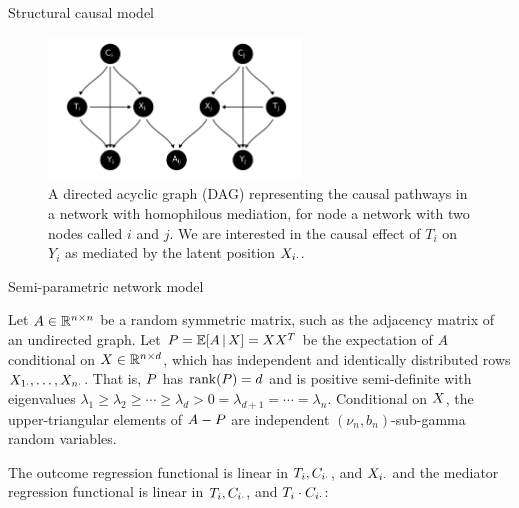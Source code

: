 \documentclass[final]{beamer}
\newlength{\colwidth}
\begin{document}
\begin{frame}[t]
\begin{columns}[t]
\begin{column}{\colwidth}

  \begin{block}{Structural causal model}

    \begin{figure}[ht]
      \centering
      \includegraphics[width=0.6\textwidth]{figures/dags/full_mediating.png}
      \caption{A directed acyclic graph (DAG) representing the causal pathways in a network with homophilous mediation, for node a network with two nodes called $i$ and $j$. We are interested in the causal effect of $T_i$ on $Y_i$ as mediated by the latent position $X_{i \cdot}$.}
      \label{fig:mediating}
    \end{figure}

  \end{block}

  \begin{block}{Semi-parametric network model}

    Let $A \in \mathbb{R}^{n \times n}$ be a random symmetric matrix, such as the adjacency matrix of an undirected graph. Let $\Apop = \E[\X]{A} = \X \X^T$ be the expectation of $A$ conditional on $X \in \mathbb{R}^{n \times d}$, which has independent and identically distributed rows $X_{1 \cdot}, \dots, X_{n \cdot}$. That is, $P$ has $\rank \paren*{\Apop} = d$ and is positive semi-definite with eigenvalues $\lambda_1 \ge \lambda_2 \ge \cdots \ge \lambda_d > 0 = \lambda_{d+1} = \cdots = \lambda_n$. Conditional on $X$, the upper-triangular elements of $A - P$ are independent $(\nu_n, b_n)$-sub-gamma random variables.
    
    The outcome regression functional is linear in $T_i, C_{i \cdot}$, and $X_{i \cdot}$ and the mediator regression functional is linear in $T_i, C_{i \cdot}$, and $T_i \cdot C_{i \cdot}$:
    

\end{block}
\end{column}
\end{columns}
\end{frame}
\end{document}
